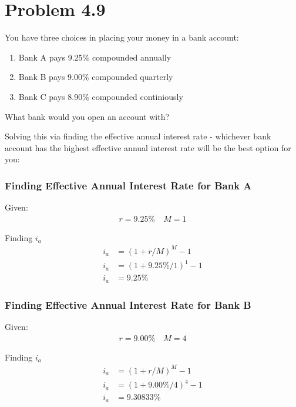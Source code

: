 \documentclass[../INDE250HW.tex]{subfiles}
\begin{document}
\newpage
\section*{Problem 4.9}
\begin{exrc}
    You have three choices in placing your money in a bank account:
    \begin{enumerate}
        \item Bank A pays 9.25\% compounded annually
        \item Bank B pays 9.00\% compounded quarterly
        \item Bank C pays 8.90\% compounded continiously
    \end{enumerate}
    What bank would you open an account with?
\end{exrc}
Solving this via finding the effective annual interest rate - whichever bank account has the highest effective annual interest rate will be the best option for you:
\subsubsection*{Finding Effective Annual Interest Rate for Bank A}
Given:
\begin{equation*}
    \begin{aligned}
        r = 9.25\% \quad M = 1
    \end{aligned}
\end{equation*}

\noindent
Finding $i_a$
\begin{equation*}
    \begin{aligned}
        i_a &= (1 + r/M)^M - 1 \\
        i_a &= (1 + 9.25\%/1)^1 - 1 \\
        i_a &= 9.25\%
    \end{aligned}
\end{equation*}

\subsubsection*{Finding Effective Annual Interest Rate for Bank B}
Given:
\begin{equation*}
    \begin{aligned}
        r = 9.00\% \quad M = 4
    \end{aligned}
\end{equation*}

\noindent
Finding $i_a$
\begin{equation*}
    \begin{aligned}
        i_a &= (1 + r/M)^M - 1 \\
        i_a &= (1 + 9.00\%/4)^4 - 1 \\
        i_a &= 9.30833\%
    \end{aligned}
\end{equation*}
\end{document}
